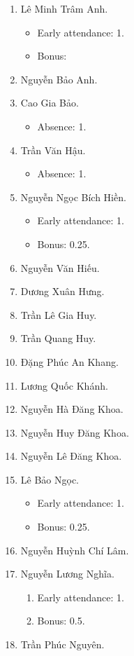 \documentclass{article}
\begin{document}
\begin{enumerate}
	\item {\sc Lê Minh Trâm Anh.}
	\begin{itemize}
		\item Early attendance: 1.
		\item Bonus: 
	\end{itemize}
	\item {\sc Nguyễn Bảo Anh.}
	\item {\sc Cao Gia Bảo.}
	\begin{itemize}
		\item Absence: 1.
	\end{itemize}
	\item {\sc Trần Văn Hậu.}
	\begin{itemize}
		\item Absence: 1.
	\end{itemize}
	\item {\sc Nguyễn Ngọc Bích Hiền.}
	\begin{itemize}
		\item Early attendance: 1.
		\item Bonus: 0.25.
	\end{itemize}
	\item {\sc Nguyễn Văn Hiếu.}
	\item {\sc Dương Xuân Hưng.}
	\item {\sc Trần Lê Gia Huy.}
	\item {\sc Trần Quang Huy.}
	\item {\sc Đặng Phúc An Khang.}
	\item {\sc Lương Quốc Khánh.}
	\item {\sc Nguyễn Hà Đăng Khoa}.
	\item {\sc Nguyễn Huy Đăng Khoa.}
	\item {\sc Nguyễn Lê Đăng Khoa.}
	\item {\sc Lê Bảo Ngọc.}
	\begin{itemize}
		\item Early attendance: 1.
		\item Bonus: 0.25.
	\end{itemize}
	\item {\sc Nguyễn Huỳnh Chí Lâm.}
	\item {\sc Nguyễn Lương Nghĩa.}
	\begin{enumerate}
		\item Early attendance: 1.
		\item Bonus: 0.5.
	\end{enumerate}
	\item {\sc Trần Phúc Nguyên.}

\end{enumerate}
\end{document}
